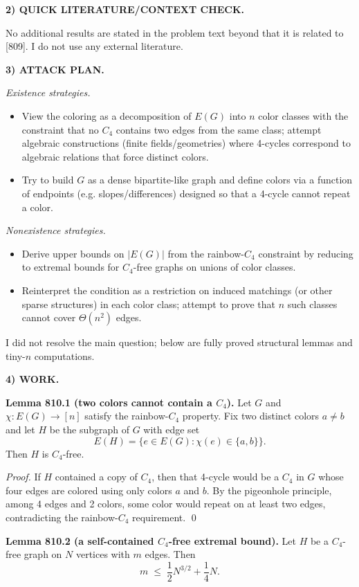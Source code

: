 \medskip
\noindent\textbf{2) QUICK LITERATURE/CONTEXT CHECK.}

No additional results are stated in the problem text beyond that it is related to [809]. I do not use any external literature.

\medskip
\noindent\textbf{3) ATTACK PLAN.}

\emph{Existence strategies.}
\begin{itemize}
\item View the coloring as a decomposition of $E(G)$ into $n$ color classes with the constraint that no $C_4$ contains two edges from the same class; attempt algebraic constructions (finite fields/geometries) where 4-cycles correspond to algebraic relations that force distinct colors.
\item Try to build $G$ as a dense bipartite-like graph and define colors via a function of endpoints (e.g. slopes/differences) designed so that a 4-cycle cannot repeat a color.
\end{itemize}

\emph{Nonexistence strategies.}
\begin{itemize}
\item Derive upper bounds on $|E(G)|$ from the rainbow-$C_4$ constraint by reducing to extremal bounds for $C_4$-free graphs on unions of color classes.
\item Reinterpret the condition as a restriction on induced matchings (or other sparse structures) in each color class; attempt to prove that $n$ such classes cannot cover $\Theta(n^2)$ edges.
\end{itemize}

I did not resolve the main question; below are fully proved structural lemmas and tiny-$n$ computations.

\medskip
\noindent\textbf{4) WORK.}

\textbf{Lemma 810.1 (two colors cannot contain a $C_4$).}
Let $G$ and $\chi:E(G)\to [n]$ satisfy the rainbow-$C_4$ property. Fix two distinct colors $a\ne b$ and let $H$ be the subgraph of $G$ with edge set
\[
E(H)=\{e\in E(G):\chi(e)\in\{a,b\}\}.
\]
Then $H$ is $C_4$-free.

\emph{Proof.}
If $H$ contained a copy of $C_4$, then that 4-cycle would be a $C_4$ in $G$ whose four edges are colored using only colors $a$ and $b$. By the pigeonhole principle, among 4 edges and 2 colors, some color would repeat on at least two edges, contradicting the rainbow-$C_4$ requirement.
\qed

\textbf{Lemma 810.2 (a self-contained $C_4$-free extremal bound).}
Let $H$ be a $C_4$-free graph on $N$ vertices with $m$ edges. Then
\[
 m\;\le\; \frac12 N^{3/2}+\frac14 N.
\]

